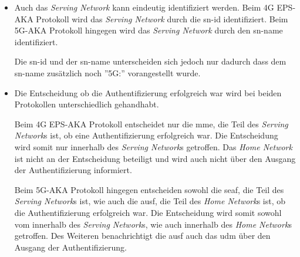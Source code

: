 \begin{itemize}
\item Auch das \textit{Serving Network} kann eindeutig identifiziert werden.
Beim 4G EPS-AKA Protokoll wird das \textit{Serving Network} durch die \gls{sn-id} identifiziert.
Beim 5G-AKA Protokoll hingegen wird das \textit{Serving Network} durch den \gls{sn-name} identifiziert.

Die \gls{sn-id} und der \gls{sn-name} unterscheiden sich jedoch nur dadurch dass dem \gls{sn-name} zusätzlich noch ''5G:'' vorangestellt wurde.

\item Die Entscheidung ob die Authentifizierung erfolgreich war wird bei beiden Protokollen unterschiedlich gehandhabt.

Beim 4G EPS-AKA Protokoll entscheidet nur die \gls{mme}, die Teil des \textit{Serving Network}s ist, ob eine Authentifizierung erfolgreich war.
Die Entscheidung wird somit nur innerhalb des \textit{Serving Network}s getroffen.
Das \textit{Home Network} ist nicht an der Entscheidung beteiligt und wird auch nicht über den Ausgang der Authentifizierung informiert.

Beim 5G-AKA Protokoll hingegen entscheiden sowohl die \gls{seaf}, die Teil des \textit{Serving Network}s ist, wie auch die \gls{ausf}, die Teil des \textit{Home Network}s ist, ob die Authentifizierung erfolgreich war.
Die Entscheidung wird somit sowohl vom innerhalb des \textit{Serving Network}s, wie auch innerhalb des \textit{Home Network}s getroffen.
Des Weiteren benachrichtigt die \gls{ausf} auch das \gls{udm} über den Ausgang der Authentifizierung.
\end{itemize}